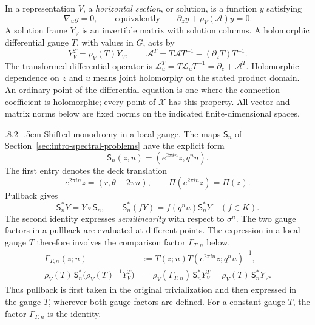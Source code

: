 \documentclass[11pt,leqno]{amsart}
\makeatletter
\numberwithin{equation}{section}
\renewcommand\paragraph{\@startsection{paragraph}{4}{\z@}%
  {.8\baselineskip \@plus .2\baselineskip}%
  {-.5em}%
  {\normalfont\normalsize\bfseries}}
\theoremstyle{plain}
\theoremstyle{definition}
\theoremstyle{plain}
\theoremstyle{definition}
\theoremstyle{remark}
\makeatother
\begin{document}
In a representation $V$, a \emph{horizontal section}, or solution, is a function $y$ satisfying
\[
 \nabla_u y=0,
 \qquad\text{equivalently}\qquad
 \partial_zy+\rho_V(\mathscr A)y=0.
\]
A solution frame $Y_V$ is an invertible matrix with solution columns.  A holomorphic differential gauge $T$, with values in $G$, acts by
\[
 Y_V^T=\rho_V(T)Y_V,\qquad
 \mathscr A^T=T\mathscr A T^{-1}-(\partial_zT)T^{-1}.
\]
The transformed differential operator is $\mathcal L_u^T=T\mathcal L_uT^{-1}=\partial_z+\mathscr A^T$.
Holomorphic dependence on $z$ and $u$ means joint holomorphy on the stated product domain.  An ordinary point of the differential equation is one where the connection coefficient is holomorphic; every point of $\mathscr X$ has this property.  All vector and matrix norms below are fixed norms on the indicated finite-dimensional spaces.

\paragraph{Shifted monodromy in a local gauge.}
The maps $\mathsf S_n$ of Section~\ref{sec:intro-spectral-problems} have the explicit form
\begin{equation}\label{eq:sym-action}
 \mathsf S_n(z,u)=(e^{2\pi in}z,q^nu).
\end{equation}
The first entry denotes the deck translation
\[
 e^{2\pi in}z=(r,\theta+2\pi n),\qquad
 \Pi(e^{2\pi in}z)=\Pi(z).
\]
Pullback gives
\begin{equation}\label{eq:forward-Symanzik-map}
 \mathsf S_n^*Y=Y\circ\mathsf S_n,\qquad
 \mathsf S_n^*(fY)=f(q^nu)\mathsf S_n^*Y\quad(f\in K).
\end{equation}
The second identity expresses \emph{semilinearity} with respect to $\sigma^n$.  The two gauge factors in a pullback are evaluated at different points.  The expression in a local gauge $T$ therefore involves the comparison factor $\Gamma_{T,n}$ below.
\begin{equation}\label{eq:local-gauge-covariant-pullback}
 \begin{aligned}
  \Gamma_{T,n}(z;u)&:=T(z;u)T(e^{2\pi in}z;q^nu)^{-1},\\
  \rho_V(T)\,\mathsf S_n^*\bigl(\rho_V(T)^{-1}Y_V^T\bigr)
   &=\rho_V(\Gamma_{T,n})\,\mathsf S_n^*Y_V^T
     =\rho_V(T)\,\mathsf S_n^*Y_V.
 \end{aligned}
\end{equation}
Thus pullback is first taken in the original trivialization and then expressed in the gauge $T$, wherever both gauge factors are defined.  For a constant gauge $T$, the factor $\Gamma_{T,n}$ is the identity.
\end{document}
